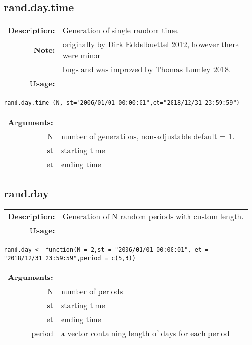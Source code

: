 \newpage%

\subsection{rand.day.time}

\begin{tabular}{rl}
	\textbf{Description:} & Generation of single random time. \\
	\textbf{Note:} & originally by \href{https://stackoverflow.com/questions/14720983/efficiently-generate-a-random-sample-of-times-and-dates-between-two-dates}{Dirk Eddelbuettel} 2012, however there were minor  \\
	& bugs and was improved by Thomas Lumley 2018. \\
	\textbf{Usage:} &
\end{tabular}

\begin{lstlisting}
rand.day.time (N, st="2006/01/01 00:00:01",et="2018/12/31 23:59:59") 
\end{lstlisting}

\begin{tabular}{rl}
	\textbf{Arguments:} &\\
	N & number of generations, non-adjustable default = 1.\\
	st & starting time\\
	et & ending time\\
\end{tabular}

\subsection{rand.day}

\begin{tabular}{rl}
	\textbf{Description:} & Generation of N random periods with custom length. \\
	\textbf{Usage:} &
\end{tabular}

\begin{lstlisting}
rand.day <- function(N = 2,st = "2006/01/01 00:00:01", et = "2018/12/31 23:59:59",period = c(5,3))
\end{lstlisting}

\begin{tabular}{rl}
	\textbf{Arguments:} &\\
	N & number of periods\\
	st & starting time\\
	et & ending time\\
	period & a vector containing length of days for each period\\
\end{tabular}

